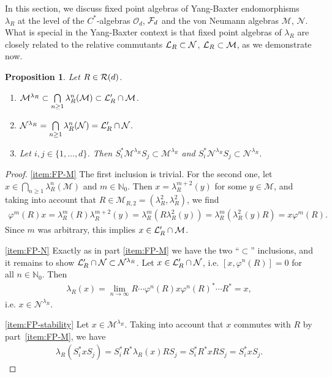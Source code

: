 \documentclass[12pt,a4paper]{amsart}
\numberwithin{equation}{section}
\newtheorem{proposition}[theorem]{Proposition}
\theoremstyle{remark}
\newcommand{\Nl}{\mathbb{N}}
\def\N{\mathbb{N}}
\newcommand{\la}{\lambda}
\newcommand{\CM}[0]{\mathcal{M}} \newcommand{\CN}[0]{\mathcal{N}}
\newcommand{\CO}[0]{\mathcal{O}} \newcommand{\CP}[0]{\mathcal{P}}
\begin{document}
In this section, we discuss fixed point algebras of Yang-Baxter endomorphisms~$\lambda_R$ at the level of the $C^*$-algebras $\CO_d$, $\mathcal{F}_d$ and the von Neumann algebras $\CM$, $\CN$. What is special in the Yang-Baxter context is that fixed point algebras of $\la_R$ are closely related to the relative commutants $\CL_R\subset\CN$, $\CL_R\subset\CM$, as we demonstrate now.


\begin{proposition}\label{proposition:generalfixedpointresults}
    Let $R\in\mathcal{R}(d)$. 
    \begin{enumerate}
        \item\label{item:FP-M} $\CM^{\lambda_R}\subset\bigcap\limits_{n\geq1}\lambda_R^n(\CM)\subset\CL_R'\cap\CM$.
        \item\label{item:FP-N} $\CN^{\lambda_R}=\bigcap\limits_{n\geq1}\lambda_R^n(\CN)=\CL_R'\cap\CN$.
        \item\label{item:FP-stability} Let $i,j\in\{1,\ldots,d\}$. Then $S_i^*\CM^{\lambda_R}S_j\subset \CM^{\lambda_R}$ and $S_i^*\CN^{\lambda_R}S_j\subset \CN^{\lambda_R}$.
    \end{enumerate}    
\end{proposition}
\begin{proof}
    \ref{item:FP-M} The first inclusion is trivial. For the second one, let $x\in\bigcap_{n\geq1}\lambda_R^n(\CM)$ and $m\in\Nl_0$. Then $x=\lambda_R^{m+2}(y)$ for some $y\in\CM$, and taking into account that $R\in\CM_{R,2}=(\lambda_R^2,\lambda_R^2)$, we find
    \begin{align*}
        \varphi^m(R)x
        =
        \lambda_R^m(R)\lambda_R^{m+2}(y)
        =
        \lambda_R^m(R\lambda_R^2(y))
        =
        \lambda_R^m(\lambda_R^2(y)R)
        =
        x\varphi^m(R).
    \end{align*}
    Since $m$ was arbitrary, this implies $x\in\CL_R'\cap\CM$.
    
    \ref{item:FP-N} Exactly as in part \ref{item:FP-M} we have the two ``$\subset$'' inclusions, and it remains to show $\CL_R'\cap\CN\subset\CN^{\la_R}$. Let $x\in\CL_R'\cap\CN$, i.e. $[x,\varphi^n(R)]=0$ for all $n\in\N_0$. Then 
    \begin{align*}
        \lambda_R(x)=\lim_{n\to\infty}R\cdots\varphi^n(R)x\varphi^n(R)^*\cdots R^*=x,
    \end{align*}
    i.e. $x\in\CN^{\lambda_R}$.
    
    \ref{item:FP-stability} Let $x\in\CM^{\lambda_R}$. Taking into account that $x$ commutes with $R$ by part~\ref{item:FP-M}, we have 
    \begin{align*}
        \lambda_R(S_i^*xS_j)=
        S_i^*R^*\lambda_R(x)RS_j
        =
        S_i^*R^*xRS_j
        =S_i^*xS_j.
    \end{align*}
\end{proof}
\end{document}
